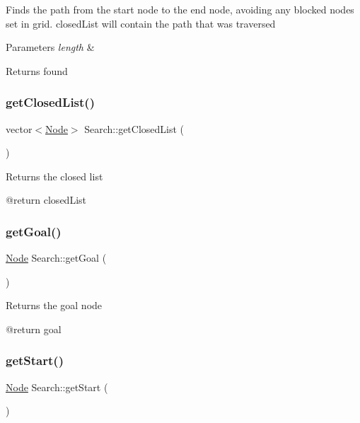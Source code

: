 Finds the path from the start node to the end node, avoiding any blocked nodes set in grid. closed\+List will contain the path that was traversed


\begin{DoxyParams}{Parameters}
{\em length} & \\
\hline
\end{DoxyParams}
\begin{DoxyReturn}{Returns}
found 
\end{DoxyReturn}
\mbox{\label{classSearch_a89084e77e24858c6edba6dd7b67b37ee}} 
\subsubsection{\texorpdfstring{get\+Closed\+List()}{getClosedList()}}
{\footnotesize\ttfamily vector$<$\hyperlink{structNode}{Node}$>$ Search\+::get\+Closed\+List (\begin{DoxyParamCaption}{ }\end{DoxyParamCaption})\hspace{0.3cm}{\ttfamily [inline]}}

Returns the closed list \begin{DoxyVerb}@return closedList\end{DoxyVerb}
 \mbox{\label{classSearch_a3a6f267df8e921ccb7feab65ad990948}} 
\subsubsection{\texorpdfstring{get\+Goal()}{getGoal()}}
{\footnotesize\ttfamily \hyperlink{structNode}{Node} Search\+::get\+Goal (\begin{DoxyParamCaption}{ }\end{DoxyParamCaption})\hspace{0.3cm}{\ttfamily [inline]}}

Returns the goal node \begin{DoxyVerb}@return goal\end{DoxyVerb}
 \mbox{\label{classSearch_a4c59b1eff090896d91582d3cbe85c0f0}} 
\subsubsection{\texorpdfstring{get\+Start()}{getStart()}}
{\footnotesize\ttfamily \hyperlink{structNode}{Node} Search\+::get\+Start (\begin{DoxyParamCaption}{ }\end{DoxyParamCaption})\hspace{0.3cm}{\ttfamily [inline]}}

